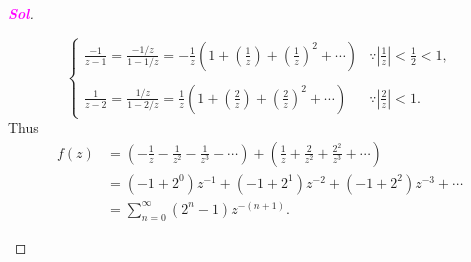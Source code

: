 \documentclass{article}
\theoremstyle{definition}
\newcommand{\of}[1]{\left( #1 \right)}
\newcommand{\abs}[1]{\left\lvert #1 \right\rvert}
\newcommand{\sol}{\textcolor{magenta}{\bf Sol}}
\begin{document}
\begin{proof}[\sol]
\begin{enumerate}[(1)]
\[\begin{cases}
			\frac{-1}{z-1}=\frac{-1/z}{1-1/z}=-\frac{1}{z}\of{1+\of{\frac{1}{z}}+\of{\frac{1}{z}}^2+\cdots} &\because\abs{\frac{1}{z}}<\frac{1}{2}<1,\\
			\\
			\frac{1}{z-2}=\frac{1/z}{1-2/z}=\frac{1}{z}\of{1+\of{\frac{2}{z}}+\of{\frac{2}{z}}^2+\cdots} &\because\abs{\frac{2}{z}}<1.
		\end{cases}
		\] Thus \begin{align*}
			f(z)&=\of{-\frac{1}{z}-\frac{1}{z^2}-\frac{1}{z^3}-\cdots}+\of{\frac{1}{z}+\frac{2}{z^2}+\frac{2^2}{z^3}+\cdots}\\
			&=(-1+2^0)z^{-1}+(-1+2^1)z^{-2}+(-1+2^2)z^{-3}+\cdots\\
			&=\sum_{n=0}^\infty\of{2^n-1}z^{-(n+1)}.
		\end{align*}
	\end{enumerate}
\end{proof}
\end{document}
